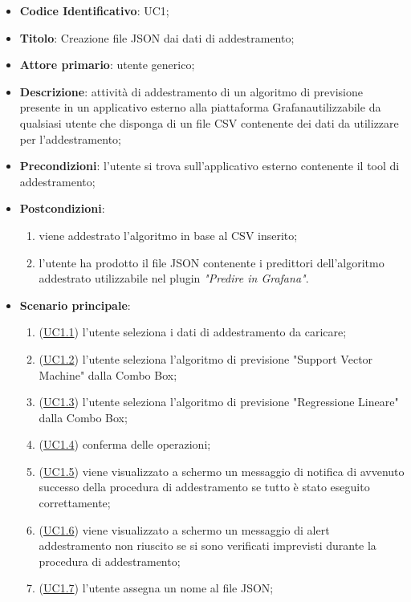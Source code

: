 		\begin{itemize}
			\item\textbf{Codice Identificativo}: UC1;
			\item\textbf{Titolo}: Creazione file JSON dai dati di addestramento;
			\item\textbf{Attore primario}: utente generico;
			\item\textbf{Descrizione}: attività di addestramento di un algoritmo di previsione presente in un applicativo esterno alla piattaforma Grafana\glo utilizzabile da qualsiasi utente che disponga di un file CSV contenente dei dati da utilizzare per l'addestramento;
			\item\textbf{Precondizioni}: l'utente si trova sull'applicativo esterno contenente il tool di addestramento;
			\item\textbf{Postcondizioni}:
				\begin{enumerate}
					\item viene addestrato l'algoritmo in base al CSV inserito;
					\item l'utente ha prodotto il file JSON contenente i predittori dell'algoritmo addestrato utilizzabile nel plugin \textit{"Predire in Grafana"}.
				\end{enumerate}
			\item\textbf{Scenario principale}:
				\begin{enumerate}
					\item (\hyperref[par:UC1.1]{UC1.1}) l'utente seleziona i dati di addestramento da caricare;
					\item (\hyperref[par:UC1.2]{UC1.2}) l'utente seleziona l'algoritmo di previsione "Support Vector Machine" dalla Combo Box\glo;
					\item (\hyperref[par:UC1.3]{UC1.3}) l'utente seleziona l'algoritmo di previsione "Regressione Lineare" dalla Combo Box\glo;
					\item (\hyperref[par:UC1.4]{UC1.4}) conferma delle operazioni;
					\item (\hyperref[par:UC1.5]{UC1.5}) viene visualizzato a schermo un messaggio di notifica di avvenuto successo della procedura di addestramento se tutto è stato eseguito correttamente;
					\item (\hyperref[par:UC1.6]{UC1.6}) viene visualizzato a schermo un messaggio di alert addestramento non riuscito se si sono verificati imprevisti durante la procedura di addestramento;
					\item (\hyperref[par:UC1.7]{UC1.7}) l'utente assegna un nome al file JSON;

\end{enumerate}
\end{itemize}
